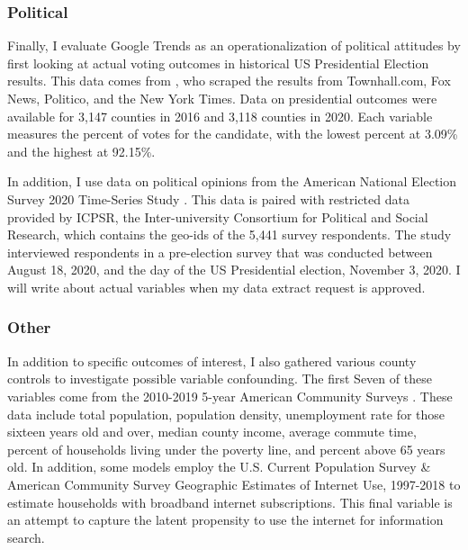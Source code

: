 \subsubsection{Political}

Finally, I evaluate Google Trends as an operationalization of political
attitudes by first looking at actual voting outcomes in historical US
Presidential Election results. This data comes from  \citet{pres_data}, who scraped the
results from Townhall.com, Fox News, Politico, and the New York Times. Data on 
presidential outcomes were available for 3,147 counties in 2016 and
3,118 counties in 2020. Each variable measures the percent of votes
for the candidate, with the lowest percent at 3.09\% and the highest at 92.15\%.

In addition, I use data on political opinions from the American National
Election Survey 2020 Time-Series Study \citep{anes_data}. This data is paired with
restricted data provided by ICPSR, the Inter-university Consortium for Political
and Social Research, which contains the geo-ids of the 5,441
survey respondents. The study interviewed respondents in a pre-election survey
that was conducted between August 18, 2020, and the day of the US Presidential
election, November 3, 2020.  %
I will write about actual variables when my data extract request is approved. 


\subsubsection{Other}

In addition to specific outcomes of interest, I also gathered various county
controls to investigate possible variable confounding. The first Seven of these
variables come from the 2010-2019 5-year American Community Surveys
\citep{acs2019, acs2018, acs2017, acs2016, acs2015, acs2014, acs2013, acs2012, acs2011, acs2010}. 
These data include total population, population density,
unemployment rate for those sixteen years old and over, median county income, average commute
time, percent of households living under the poverty line, and percent above 65
years old. In addition, some models employ the U.S. Current Population Survey \&
American Community Survey Geographic Estimates of Internet Use, 1997-2018
\citep{internet_use} to estimate households with broadband internet subscriptions.
This final variable is an attempt to capture the latent propensity to use the
internet for information search.

